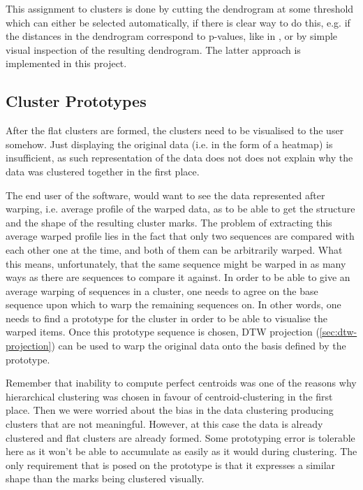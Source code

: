 \documentclass[parskip]{cs4rep}
\begin{document}
This assignment to clusters is done by cutting the dendrogram at some threshold which can either be selected automatically, if there is clear way to do this, e.g. if the distances in the dendrogram correspond to p-values, like in \cite{Wang:2012cb}, or by simple visual inspection of the resulting dendrogram. The latter approach is implemented in this project.

\subsection{Cluster Prototypes}
\label{sec:prototypes}

After the flat clusters are formed, the clusters need to be visualised to the user somehow. Just displaying the original data (i.e. in the form of a heatmap) is insufficient, as such representation of the data does not does not explain why the data was clustered together in the first place. 

The end user of the software, would want to see the data represented after warping, i.e. average profile of the warped data, as to be able to get the structure and the shape of the resulting cluster marks. The problem of extracting this average warped profile lies in the fact that only two sequences are compared with each other one at the time, and both of them can be arbitrarily warped. What this means, unfortunately, that the same sequence might be warped in as many ways as there are sequences to compare it against. In order to be able to give an average warping of sequences in a cluster, one needs to agree on the base sequence upon which to warp the remaining sequences on. In other words,
one needs to find a prototype for the cluster in order to be able to visualise the warped items. Once this prototype sequence is chosen, DTW projection (\autoref{sec:dtw-projection}) can be used to warp the original data onto the basis defined by the prototype.

Remember that inability to compute perfect centroids was one of the reasons why hierarchical clustering was chosen in favour of centroid-clustering in the first place. Then we were worried about the bias in the data clustering producing clusters that are not meaningful. However, at this case the data is already clustered and flat clusters are already formed. Some prototyping error is tolerable here as it won't be able to accumulate as easily as it would during clustering. The only requirement that is posed on the prototype is that it expresses a similar shape than the marks being clustered visually.
\end{document}
